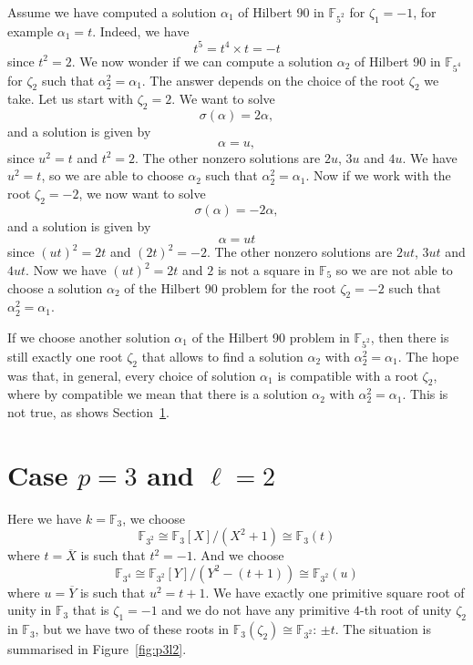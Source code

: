 \documentclass[a4paper,11pt]{article}
\begin{document}
Assume we have computed a solution $\alpha_1$ of Hilbert 90 in
$\mathbb{F}_{5^2}$ for $\zeta_1=-1$, for example $\alpha_1=t$. Indeed, we have 
\[
  t^5 = t^4\times t = -t
\]
since $t^2=2$. We now wonder if we can compute a solution $\alpha_2$ of Hilbert
90 in $\mathbb{F}_{5^4}$ for $\zeta_2$ such that $\alpha_2^2=\alpha_1$. The
answer depends on the choice of the root $\zeta_2$ we take. Let us start with
$\zeta_2 = 2$. We want to solve
\[
  \sigma(\alpha) = 2\alpha,
\]
and a solution is given by 
\[
  \alpha = u,
\]
since $u^2 = t$ and $t^2 = 2$. The other nonzero solutions are $2u$, $3u$ and
$4u$. We have $u^2 = t$, so we are able to choose $\alpha_2$ such that
$\alpha_2^2 = \alpha_1$. Now if we work with the root $\zeta_2=-2$, we now want
to solve
\[
  \sigma(\alpha) = -2\alpha,
\]
and a solution is given by
\[
  \alpha = ut
\]
since $(ut)^2 = 2t$ and $(2t)^2 = -2$. The other nonzero solutions are $2ut$, $3ut$ and
$4ut$. Now we have $(ut)^2 = 2t$ and $2$ is not a square in $\mathbb{F}_5$ so we
are not able to choose a solution $\alpha_2$ of the Hilbert 90 problem for the
root $\zeta_2=-2$ such that $\alpha_2^2=\alpha_1$.

If we choose another solution $\alpha_1$ of the Hilbert 90 problem in
$\mathbb{F}_{5^2}$, then there is still exactly one root $\zeta_2$ that allows to find a
solution $\alpha_2$ with $\alpha_2^2=\alpha_1$. The hope was that, in general,
every choice of solution $\alpha_1$ is compatible with a root $\zeta_2$, where by
compatible we mean that there is a solution $\alpha_2$ with
$\alpha_2^2=\alpha_1$. This is not true, as shows Section~\ref{sec:p3l2}.

\section{Case $p=3$ and $\ell=2$}
\label{sec:p3l2}

Here we have $k=\mathbb{F}_3$,
we choose
\[
  \mathbb{F}_{3^2}\cong\mathbb{F}_3[X]/(X^2+1)\cong\mathbb{F}_3(t)
\]
where
$t=\overline X$ is such that $t^2=-1$. And we choose 
\[
  \mathbb{F}_{3^4}\cong
\mathbb{F}_{3^2}[Y]/(Y^2-(t+1))\cong \mathbb{F}_{3^2}(u)
\]
where $u=\overline
Y$ is such that $u^2 = t+1$. We have exactly one primitive square root of
unity in $\mathbb{F}_3$ that is $\zeta_1 = -1$ and we do not have any primitive $4$-th
root of unity $\zeta_2$ in $\mathbb{F}_3$, but we have two of these roots in
$\mathbb{F}_3(\zeta_2)\cong \mathbb{F}_{3^2}$: $\pm t$. The situation is
summarised in Figure~\ref{fig:p3l2}.
\end{document}
